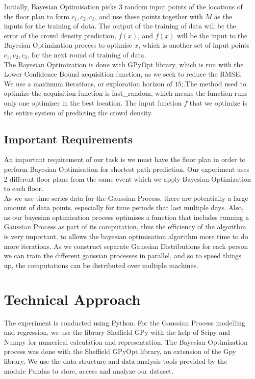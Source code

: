 \documentclass[letterpaper]{article}
\begin{document}
Initially, Bayesian Optimisation picks 3 random input points of the locations of the floor plan to form $c_1, c_2, c_3$, and use these points together with $M$ as the inputs for the training of data. The output of the training of data will be the error of the crowd density prediction, $f(x)$, and $f(x)$ will be the input to the Bayesian Optimization process to optimise $x$, which is another set of input points $c_1, c_2, c_3$, for the next round of training of data. \\

The Bayesian Optimization is done with GPyOpt library, which is run with the Lower Confidence Bound acquisition function, as we seek to reduce the RMSE. We use a maximum iterations, or exploration horizon of $15$;.The method used to optimize the acquisition function is fast\_random, which means the function runs only one optimizer in the best location. The input function $f$ that we optimize is the entire system of predicting the crowd density.

\subsection{Important Requirements}

An important requirement of our task is we must have the floor plan in order to perform Bayesian Optimisation for shortest path prediction. Our experiment uses 2 different floor plans from the same event which we apply Bayesian Optimization to each floor.\\

As we use time-series data for the Gaussian Process, there are potentially a large amount of data points, especially for time periods that last multiple days. Also, as our bayesian optimisation process optimises a function that includes running a Gaussian Process as part of its computation, thus the efficiency of the algorithm is very important, to allows the bayesian optimisation algorithm more time to do more iterations. As we construct separate Gaussian Distributions for each person we can train the different gaussian processes in parallel, and so to speed things up, the computations can be distributed over multiple machines.


\section{Technical Approach}
The experiment is conducted using Python. For the Gaussian Process modelling and regression, we use the library Sheffield GPy with the help of Scipy and Numpy for numerical calculation and representation. The Bayesian Optimization process was done with the Sheffield GPyOpt library, an extension of the Gpy library. We use the data structure and data analysis tools provided by the module Pandas to store, access and analyze our dataset.
\end{document}

